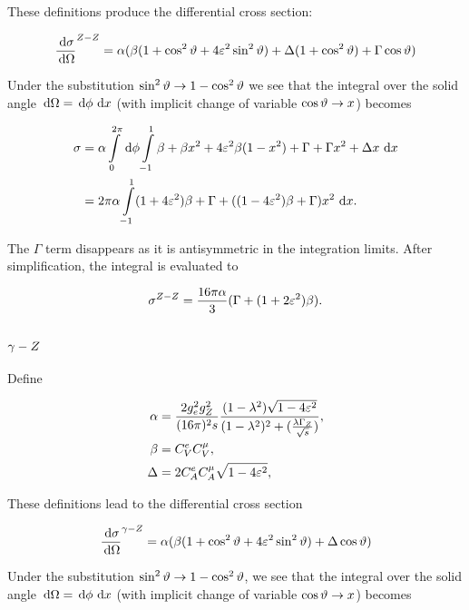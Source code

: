 \documentclass[]{report}
\begin{document}
These definitions produce the differential cross section:

$$
\frac{\,\operatorname{d}\!{\sigma}}{\,\operatorname{d}\!{\Omega}}^{Z -Z }
  = \alpha(\beta(1+\cos^{2}{\vartheta}+4\varepsilon^{2}\sin^{2}{\vartheta})
    + \Delta(1+\cos^{2}{\vartheta})
    + \Gamma\cos{\vartheta}
  )
$$

Under the substitution $\sin^{2}{\vartheta} \rightarrow 1-\cos^{2}{\vartheta}$ we see that the integral over the solid angle $\,\operatorname{d}\!{\Omega} = \,\operatorname{d}\!{\phi}\,\operatorname{d}\!{x}$ (with implicit change of variable $\cos{\vartheta}\rightarrow x$) becomes

\begin{align*}
\sigma &= \alpha\int\limits_{0}^{2\pi}\d{\phi}\int\limits_{-1}^{1}
	\beta + \beta x^{2} + 4\varepsilon^{2}\beta(1-x^{2}) + \Gamma + \Gamma x^{2} + \Delta x
	\d{x}
  \\
  &= 2\pi\alpha\int\limits_{-1}^{1}
		(1 + 4\varepsilon^{2})\beta + \Gamma + ((1 - 4\varepsilon^{2})\beta + \Gamma)x^{2}
    \d{x}.
\end{align*}

The $\Gamma$ term disappears as it is antisymmetric in the integration limits. After simplification, the integral is evaluated to

$$
\sigma^{\Zzero-\Zzero} = \frac{16\pi\alpha}{3}(\Gamma + (1 + 2\varepsilon^{2})\beta).
$$

\subsection{$\gamma-Z $}

Define

\begin{align*}
\alpha &= \frac{2g_{e}^{2}g_{\Zzero}^{2}}{(16\pi)^{2}s} \frac{(1-\lambda^{2})\sqrt{1-4\varepsilon^{2}}}{(1-\lambda^{2})^{2} + (\frac{\lambda\Gamma_{\Zzero}}{\rts})},
\\
\beta &= C^{e}_{V}C^{\mu}_{V},
\\
\Delta &= 2C^{e}_{A}C^{\mu}_{A}\sqrt{1-4\varepsilon^{2}},
\end	{align*}

These definitions lead to the differential cross section

$$
\frac{\,\operatorname{d}\!{\sigma}}{\,\operatorname{d}\!{\Omega}}^{\gamma-Z }
  = \alpha(\beta(1+\cos^{2}{\vartheta}+4\varepsilon^{2}\sin^{2}{\vartheta})
    + \Delta\cos{\vartheta}
  )
$$

Under the substitution $\sin^{2}{\vartheta} \rightarrow 1-\cos^{2}{\vartheta}$, we see that the integral over the solid angle $\,\operatorname{d}\!{\Omega} = \,\operatorname{d}\!{\phi}\,\operatorname{d}\!{x}$ (with implicit change of variable $\cos{\vartheta}\rightarrow x$) becomes
\end{document}
